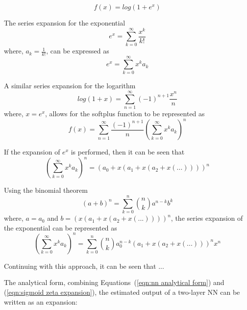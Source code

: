 \begin{equation}
	f(x) = log(1+e^x)
\end{equation}

The series expansion for the exponential
\begin{equation}
	e^x = \sum_{k=0}^\infty \frac{x^k}{k!}
\end{equation}
where, $a_k = \frac{1}{k!}$, can be expressed as
\begin{equation}
	e^x = \sum_{k=0}^\infty x^k a_k
\end{equation}

A similar series expansion for the logarithm
\begin{equation}
	log(1+x) = \sum_{n=1}^\infty (-1)^{n+1} \frac{x^n}{n}
\end{equation}
where, $x = e^x$,
allows for the softplus function to be represented as
\begin{equation}
	f(x) = \sum_{n=1}^\infty \frac{(-1)^{n+1}}{n} 				(\sum_{k=0}^\infty x^k a_k)^n
\end{equation}

If the expansion of $e^x$ is performed, then it can be seen that
\begin{equation}
	(\sum_{k=0}^\infty x^k a_k)^n = 								(a_0+x(a_1+x(a_2+x(...))))^n
\end{equation}

Using the binomial theorem
\begin{equation}
	(a+b)^n = \sum_{k=0}^{n} \binom{n}{k} a^{n-k} b^k
\end{equation}
where, $a=a_0$ and $b=(x(a_1+x(a_2+x(...))))^n$, the series expansion of the exponential can be represented as
\begin{equation}
	(\sum_{k=0}^\infty x^k a_k)^n = \sum_{k=0}^{n} 				\binom{n}{k} a_0^{n-k} (a_1+x(a_2+x(...)))^n x^n
\end{equation}

Continuing with this approach, it can be seen that ...

The analytical form, combining Equations~(\ref{eqn:nn analytical form}) and (\ref{eqn:sigmoid zeta expansion}), the estimated output of a two-layer NN can be written as an expansion:

